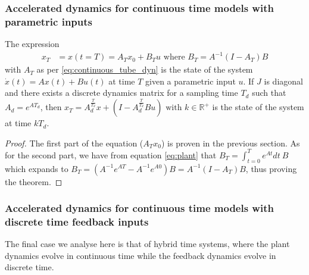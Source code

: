 \documentclass[sigconf]{llncs}
\newcommand{\mat}[1]{{#1}}
\renewcommand{\vec}[1]{{#1}}
\begin{document}
 \subsubsection{Accelerated dynamics for continuous time models with parametric inputs}\label{sec:cont_acc_param_inputs}
\begin{lemma}
The expression
 \begin{align}
 \vec{x}_T&=\vec{x}(t=T)=\mat{A}_T\vec{x}_0 + \mat{B}_T\vec{u} \text{ where } \mat{B}_T=\mat{A}^{-1}(\mat{I}-\mat{A}_T)\mat{B} 
 \label{eq:param_discretize}
 \end{align}
 with $\mat{A}_T$ as per \eqref{eq:continuous_tube_dyn} is the state of the system $\dot{\vec{x}}(t)=\mat{A}\vec{x}(t)+\mat{B}\vec{u}(t)$ at time $T$ given a parametric input $\vec{u}$.
 If $\mat{J}$ is diagonal and there exists a discrete dynamics matrix for a sampling time $T_d$ such that $A_d=e^{\mat{A} T_d}$, then $\vec{x}_T=A_d^{\frac{T}{T_d}}\vec{x}+(\mat{I}-\mat{A}_d^{\frac{T}{T_d}}\mat{B}\vec{u}) \text{ with } k \in \mathbb{R}^+$ is the state of the system at time $kT_d$.
 \end{lemma}
 \begin{proof}
 The first part of the equation ($\mat{A}_T\vec{x}_0$) is proven in the previous section.  As for the second part, we have from equation \eqref{eq:plant}
that $\mat{B}_T = \int_{t = 0}^{T} e^{\mat{A} t} dt\ \mat{B}$ which expands to $\mat{B}_T= (\mat{A}^{-1} e^{\mat{A}T}-\mat{A}^{-1} e^{\mat{A} 0}) \mat{B}=\mat{A}^{-1}(\mat{I}-\mat{A}_T)\mat{B}$, thus proving the theorem.
 \end{proof}
  
 \subsubsection{Accelerated dynamics for continuous time models with discrete time feedback inputs}\label{asec:real_discrete_feedback_inputs}

The final case we analyse here is that of hybrid time systems, where the
plant dynamics evolve in continuous time while the feedback dynamics evolve
in discrete time.
\end{document}
